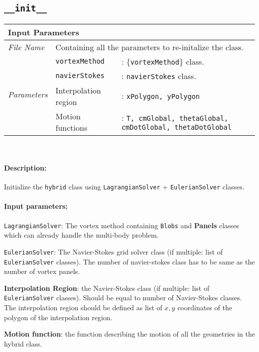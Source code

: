 \subsection*{\texttt{\_\_init\_\_}}
	\begin{tabular}{l|lp{7cm}}
		\multicolumn{2}{l}{\textbf{Input Parameters}} & \\ \hline
		\textit{File Name} & \multicolumn{2}{l}{Containing all the parameters to re-initalize the class.} \\ \hline
		\multirow{4}{*}{\textit{Parameters}} & \texttt{vortexMethod} &: \{\texttt{vortexMethod}\} class.\\ \cline{2-3}
		& \texttt{navierStokes} &: \texttt{navierStokes} class. \\ \cline{2-3}
		& Interpolation region &: \texttt{xPolygon, yPolygon}\\ \cline{2-3}
		& Motion functions &: \texttt{T, cmGlobal, thetaGlobal, cmDotGlobal, thetaDotGlobal}\\ \cline{2-3}
	\end{tabular}\\
	
	\paragraph{Description:} Initialize the \texttt{hybrid} class using \texttt{LagrangianSolver} + \texttt{EulerianSolver} classes.
	\paragraph{Input parameters:}
	\begin{list}{\quad}{}
	\item \texttt{LagrangianSolver}: The vortex method containing \texttt{Blobs} and \textbf{Panels} classes which can already handle the multi-body problem.
	\item \texttt{EulerianSolver}: The Navier-Stokes grid solver class (if multiple: list of \\ \texttt{EulerianSolver} classes). The number of navier-stokes class has to be same as the number of vortex panels.
	\item \textbf{Interpolation Region}: the Navier-Stokes class (if multiple: list of \\ \texttt{EulerianSolver} classes). Should be equal to number of Navier-Stokes classes. The interpolation region should be defined as list of $x,y$ coordinates of the polygon of the interpolation region.
	\item \textbf{Motion function}: the function describing the motion of all the geometries in the hybrid class.
	\end{list}
	
